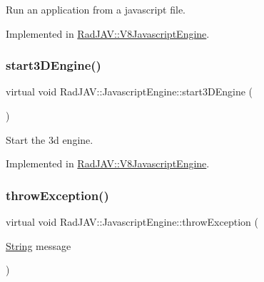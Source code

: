 Run an application from a javascript file. 



Implemented in \mbox{\hyperlink{class_rad_j_a_v_1_1_v8_javascript_engine_aa0d9d2f20abcf434f8986f7417ebcc3e}{Rad\+J\+A\+V\+::\+V8\+Javascript\+Engine}}.

\mbox{\label{class_rad_j_a_v_1_1_javascript_engine_a76c00d87d65f69781e2dc4aa3143acac}} 
\subsubsection{\texorpdfstring{start3\+D\+Engine()}{start3DEngine()}}
{\footnotesize\ttfamily virtual void Rad\+J\+A\+V\+::\+Javascript\+Engine\+::start3\+D\+Engine (\begin{DoxyParamCaption}{ }\end{DoxyParamCaption})\hspace{0.3cm}{\ttfamily [pure virtual]}}



Start the 3d engine. 



Implemented in \mbox{\hyperlink{class_rad_j_a_v_1_1_v8_javascript_engine_ae2e4091f33966a1d722690bcd69f2cde}{Rad\+J\+A\+V\+::\+V8\+Javascript\+Engine}}.

\mbox{\label{class_rad_j_a_v_1_1_javascript_engine_ab9f13c1928d6967122d0f9a6a026dc73}} 
\subsubsection{\texorpdfstring{throw\+Exception()}{throwException()}}
{\footnotesize\ttfamily virtual void Rad\+J\+A\+V\+::\+Javascript\+Engine\+::throw\+Exception (\begin{DoxyParamCaption}\item[{\mbox{\hyperlink{class_rad_j_a_v_1_1_string}{String}}}]{message }\end{DoxyParamCaption})\hspace{0.3cm}{\ttfamily [pure virtual]}}



